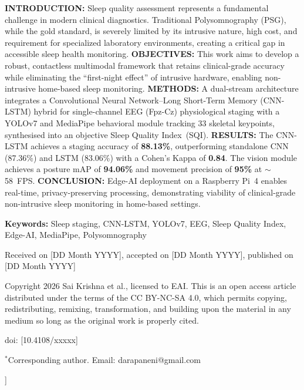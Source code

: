 \documentclass[10pt, a4paper, twocolumn]{article}
\begin{document}
{%
\begin{tcolorbox}[
  colback  = eailightbg,
  colframe = eailightbg,
  boxrule  = 0pt,
  arc      = 0pt,
  left=6pt, right=6pt, top=5pt, bottom=5pt,
  width    = \linewidth
]
{\small\noindent
\textbf{INTRODUCTION:} Sleep quality assessment represents a fundamental challenge
in modern clinical diagnostics. Traditional Polysomnography (PSG), while the gold
standard, is severely limited by its intrusive nature, high cost, and requirement for
specialized laboratory environments, creating a critical gap in accessible sleep health
monitoring.
\textbf{OBJECTIVES:} This work aims to develop a robust, contactless multimodal
framework that retains clinical-grade accuracy while eliminating the ``first-night
effect'' of intrusive hardware, enabling non-intrusive home-based sleep monitoring.
\textbf{METHODS:} A dual-stream architecture integrates a Convolutional Neural
Network--Long Short-Term Memory (CNN-LSTM) hybrid for single-channel EEG (Fpz-Cz)
physiological staging with a YOLOv7 and MediaPipe behavioral module tracking
33 skeletal keypoints, synthesised into an objective Sleep Quality Index~(SQI).
\textbf{RESULTS:} The CNN-LSTM achieves a staging accuracy of \textbf{88.13\%},
outperforming standalone CNN (87.36\%) and LSTM (83.06\%) with a Cohen's Kappa
of \textbf{0.84}. The vision module achieves a posture mAP of \textbf{94.06\%}
and movement precision of \textbf{95\%} at $\sim$58~FPS.
\textbf{CONCLUSION:} Edge-AI deployment on a Raspberry Pi~4 enables real-time,
privacy-preserving processing, demonstrating viability of clinical-grade non-intrusive
sleep monitoring in home-based settings.}
\end{tcolorbox}

\vspace{7pt}
{\small\noindent\textbf{Keywords:} Sleep staging, CNN-LSTM, YOLOv7, EEG,
Sleep Quality Index, Edge-AI, MediaPipe, Polysomnography\par}

\vspace{5pt}
{\small\noindent Received on [DD Month YYYY], accepted on [DD Month YYYY],
published on [DD Month YYYY]\par}

\vspace{4pt}
{\small\noindent Copyright \textcopyright{} 2026 Sai Krishna et al., licensed to EAI.
This is an open access article distributed under the terms of the CC BY-NC-SA 4.0,
which permits copying, redistributing, remixing, transformation, and building upon
the material in any medium so long as the original work is properly cited.\par}

\vspace{3pt}
{\small\noindent doi: [10.4108/xxxxx]\par}

\vspace{3pt}
{\small\noindent $^{*}$Corresponding author. Email: darapaneni@gmail.com\par}

\vspace{14pt}
}]  %
\end{document}
